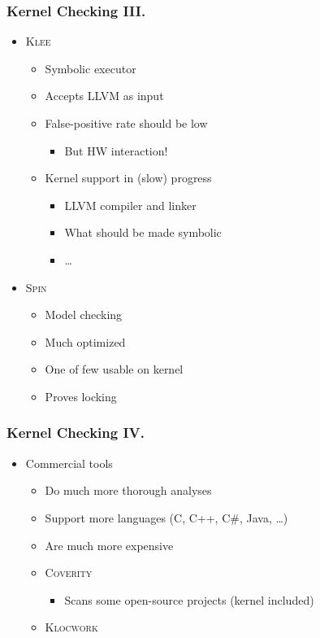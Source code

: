 \documentclass[handout,xcolor=dvipsnames]{beamer}
\begin{document}
\begin{frame}
  \frametitle{Kernel Checking III.}
  \begin{itemize}
  \item[(4)] \textsc{Klee}
  \begin{itemize}
  \item Symbolic executor
  \item Accepts \textsc{LLVM} as input
  \item False-positive rate should be low
  \begin{itemize}
  \item But HW interaction!
  \end{itemize}
  \item Kernel support in (slow) progress
  \begin{itemize}
  \item LLVM compiler and linker
  \item What should be made symbolic
  \item \ldots
  \end{itemize}
  \end{itemize} \pause

  \item[(5)] \textsc{Spin}
  \begin{itemize}
  \item Model checking
  \item Much optimized
  \item One of few usable on kernel
  \item Proves locking
  \end{itemize}
  \end{itemize}

\end{frame}

\begin{frame}
  \frametitle{Kernel Checking IV.}
  \begin{itemize}
  \item[(6)] Commercial tools 
  \begin{itemize}
  \item Do much more thorough analyses
  \item Support more languages (C, C++, C\#, Java, \ldots)
  \item Are much more expensive
  \pause
  \item \textsc{Coverity}
  \begin{itemize}
  \item Scans some open-source projects (kernel included)
  \end{itemize}
  \item \textsc{Klocwork}
  \end{itemize}
  \end{itemize}

\end{frame}
\end{document}
